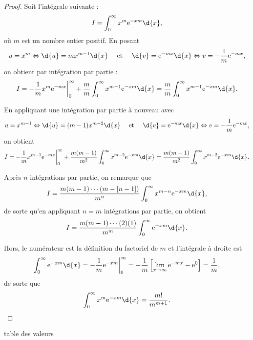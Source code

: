 \documentclass[11pt]{article}
\newcommand\e{%
    \ensuremath{%
        \mathrm{e}%
    }%
}
\begin{document}
\begin{proof}
    Soit l'intégrale suivante :
    \begin{equation*}
        I=\int_0^\infty x^m\e^{-xm}\d{x},
    \end{equation*}
    où $m$ est un nombre entier positif. En posant
    \begin{equation*}
        u=x^m\Leftrightarrow\d{u}=mx^{m-1}\d{x}\quad\text{ et }\quad
        \d{v}=\e^{-mx}\d{x}\Leftrightarrow v=-\frac{1}{m}\e^{-mx},
    \end{equation*}
    on obtient par intégration par partie :
    \begin{equation*}
        I
        =-\frac{1}{m}x^m\e^{-mx}\bigg\rvert_0^\infty+
            \frac{m}{m}\int_0^\infty x^{m-1}\e^{-xm}\d{x}
        =\frac{m}{m}\int_0^\infty x^{m-1}\e^{-xm}\d{x}.
    \end{equation*}
    
    En appliquant une intégration par partie à nouveau avec
        \begin{equation*}
        u=x^{m-1}\Leftrightarrow\d{u}=(m-1)x^{m-2}\d{x}\quad\text{ et }\quad
        \d{v}=\e^{-mx}\d{x}\Leftrightarrow v=-\frac{1}{m}\e^{-mx},
    \end{equation*}
    on obtient
    \begin{equation*}
        I
        =-\frac{1}{m}x^{m-1}\e^{-mx}\bigg\rvert_0^\infty+
            \frac{m(m-1)}{m^2}\int_0^\infty x^{m-2}\e^{-xm}\d{x}
        =\frac{m(m-1)}{m^2}\int_0^\infty x^{m-2}\e^{-xm}\d{x}.
    \end{equation*}
    
    Après $n$ intégrations par partie, on remarque que
    \begin{equation*}
        I=\frac{m(m-1)\cdots(m-[n-1])}{m^n}\int_0^\infty x^{m-n}\e^{-xm}\d{x},
    \end{equation*}
    de sorte qu'en appliquant $n=m$ intégrations par partie, on obtient
    \begin{equation*}
        I=\frac{m(m-1)\cdots(2)(1)}{m^m}\int_0^\infty\e^{-xm}\d{x}.
    \end{equation*}

    Hors, le numérateur est la définition du factoriel de $m$ et l'intégrale
    à droite est
    \begin{equation*}
        \int_0^\infty\e^{-xm}\d{x}
        =-\frac{1}{m}\e^{-xm}\bigg\rvert_0^\infty
        =-\frac{1}{m}\left[\lim_{x\rightarrow\infty}\e^{-mx}-\e^0\right]
        =\frac{1}{m}.
    \end{equation*}
    de sorte que
    \begin{equation*}
        \int_0^\infty x^m\e^{-xm}\d{x}=\frac{m!}{m^{m+1}}.\qedhere
    \end{equation*}
\end{proof}

\begin{table}[H]
    \centering
	\caption{table des valeurs}
	\vspace{5mm}
    
\end{table}
\end{document}
